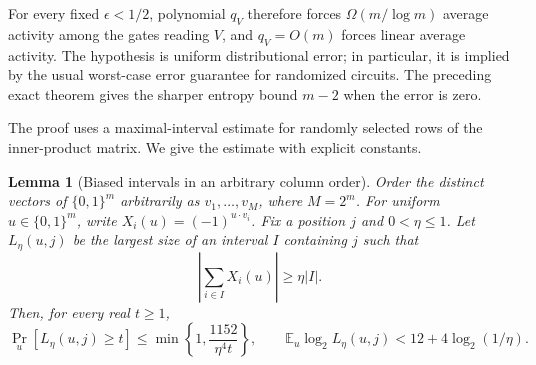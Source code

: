 \documentclass[11pt]{article}
\newtheorem{lemma}[theorem]{Lemma}
\theoremstyle{definition}
\newcommand{\bits}{\{0,1\}}
\begin{document}
For every fixed \(\epsilon<1/2\), polynomial \(q_V\) therefore forces
\(\Omega(m/\log m)\) average activity among the gates reading \(V\), and
\(q_V=O(m)\) forces linear average activity. The hypothesis is uniform
distributional error; in particular, it is implied by the usual worst-case
error guarantee for randomized circuits. The preceding exact theorem gives
the sharper entropy bound \(m-2\) when the error is zero.

The proof uses a maximal-interval estimate for randomly selected rows of the
inner-product matrix. We give the estimate with explicit constants.

\begin{lemma}[Biased intervals in an arbitrary column order]
\label{lem:sp-biased-interval}
Order the distinct vectors of \(\bits^m\) arbitrarily as
\(v_1,\ldots,v_M\), where \(M=2^m\). For uniform \(u\in\bits^m\), write
\(X_i(u)=(-1)^{u\cdot v_i}\). Fix a position \(j\) and \(0<\eta\le1\).
Let \(L_\eta(u,j)\) be the largest size of an interval \(I\) containing
\(j\) such that
\[
 \left|\sum_{i\in I}X_i(u)\right|\ge\eta|I|.
\]
Then, for every real \(t\ge1\),
\[
 \Pr_u[L_\eta(u,j)\ge t]
 \le\min\left\{1,\frac{1152}{\eta^4t}\right\},
 \qquad
 \mathbb E_u\log_2L_\eta(u,j)
 <12+4\log_2(1/\eta).                                    \tag{E3}
\]
\end{lemma}
\end{document}
